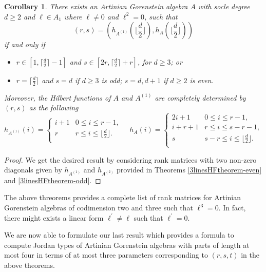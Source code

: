 \documentclass[12pt]{amsart}
\numberwithin{equation}{section}
\theoremstyle{plain} \newtheorem{theorem}{Theorem}[section]
\newtheorem{corollary}[theorem]{Corollary}
\theoremstyle{definition} \newtheorem{definition}[theorem]{Definition}
\begin{document}
\begin{corollary}\label{2linescorollary}
There exists an Artinian Gorenstein algebra $A$ with socle degree $d\geq 2$ and $\ell\in A_1$ where $\ell\neq 0$ and $\ell^2=0$,  such that 
$$
(r,s)=\left(h_{A^{(1)}}(\lfloor\frac{d}{2}\rfloor), h_{A}(\lfloor\frac{d}{2}\rfloor)\right)
$$
 if and only if 
 \begin{itemize}
 \item $r\in[1,\lceil\frac{d}{2}\rceil-1]$ and $s\in [2r,\lceil\frac{d}{2}\rceil+r ]$, for $d\geq 3$; or
 \item $r= \lceil\frac{d}{2}\rceil$ and $s=d$ if $d\geq 3$ is odd; $s=d,d+1$ if  $d\geq 2$ is even.
 \end{itemize}
 Moreover, the Hilbert functions of $A$ and $A^{(1)}$ are completely determined by $(r,s)$ as the following 
\begin{equation}\label{HF2lines}
h_{A^{(1)}}(i)=\left\{
                \begin{array}{ll}
                  i+1 & 0\leq i\leq r-1,\\
                  r & r\leq i\leq\lfloor\frac{d}{2}\rfloor.\\
                \end{array}
              \right.\quad
h_{A}(i)=\left\{
                \begin{array}{ll}
                  2i+1 &  0\leq i\leq r-1,\\
                   i+r+1 &  r\leq i\leq s-r-1,\\
                  s & s-r\leq i\leq \lfloor\frac{d}{2}\rfloor.\\
                \end{array}
              \right.
 \end{equation}
\end{corollary}
\begin{proof}
We get the desired result by considering rank matrices with two non-zero diagonals given by $h_{A^{(1)}}$ and $h_{A^{(2)}}$ provided in Theorems \ref{3linesHFtheorem-even} and  \ref{3linesHFtheorem-odd}.
\end{proof}
\begin{remark}
The above threorems provides a complete list of rank matrices for Artinian Gorenstein algebras of codimension two and three such that $\ell^3=0$. In fact, there might exists a linear form $\ell^\prime\neq \ell$ such that $\ell^\prime= 0$. 
\end{remark}
We are now able to formulate our last result which provides a formula to compute Jordan types of Artinian Gorenstein algebras with parts of length at most four in terms of at most three parameters corresponding to $(r,s,t)$ in the above theorems.
\end{document}
